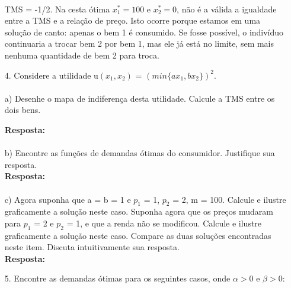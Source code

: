 \begin{enumerate}
\begin{center}
\begin{tikzpicture}[scale=0.8]
				\end{tikzpicture}\\
				 
			\end{center} 
			
TMS = -1/2. Na cesta ótima {$x_{1}^{*} = 100$} e {$x_{2}^{*} = 0$}, não é a válida a igualdade entre a TMS e a relação de preço. Isto ocorre porque estamos em uma solução de canto: apenas o bem 1 é consumido. Se fosse possível, o indivíduo continuaria a trocar bem 2 por bem 1, mas ele já está no limite, sem mais nenhuma quantidade de bem 2 para troca.


\item[4.] Considere a utilidade u{$(x_1, x_2)$} = {$(min\{ax_1, bx_2\})^{2}$}.\\

\paragraph{} a)  Desenhe o mapa de indiferença desta utilidade. Calcule a TMS entre os dois bens.

\textbf{Resposta:}\\

\paragraph{} b) Encontre as funções de demandas ótimas do consumidor. Justifique sua resposta.\\

\textbf{Resposta:}\\

\paragraph{} c) Agora suponha que a = b = 1 e {$p_1$} = 1, {$p_2$} = 2, m = 100. Calcule e ilustre graficamente a solução neste caso. Suponha agora que os preços mudaram para {$p_1$} = 2 e {$p_2$} = 1, e que a renda não se modificou. Calcule e ilustre graficamente a solução neste caso. Compare as duas soluções encontradas neste item. Discuta intuitivamente sua resposta.\\

\textbf{Resposta:}\\

\item[5.] Encontre as demandas ótimas para os seguintes casos, onde {$\alpha > 0$} e {$\beta > 0$}:\\


\end{enumerate}
